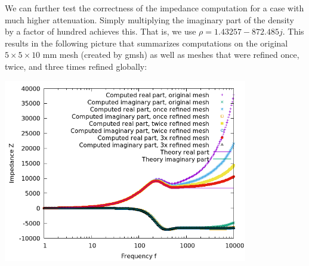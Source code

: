 \documentclass{article}
\begin{document}
We can further test the correctness of the impedance computation for a
case with much higher attenuation. Simply multiplying the imaginary
part of the density by a factor of hundred achieves this. That is, we
use $\rho=1.43257-872.485j$. This results in the following picture
that summarizes computations on the original $5\times 5\times 10$ mm
mesh (created by gmsh) as well as meshes that were refined once,
twice, and three times refined globally:
\begin{center}
\includegraphics[width=0.8\textwidth]{wave-guide-tet-real-material-jasons-mesh-high-attenuation-0/impedance.png}
\end{center}
\end{document}
